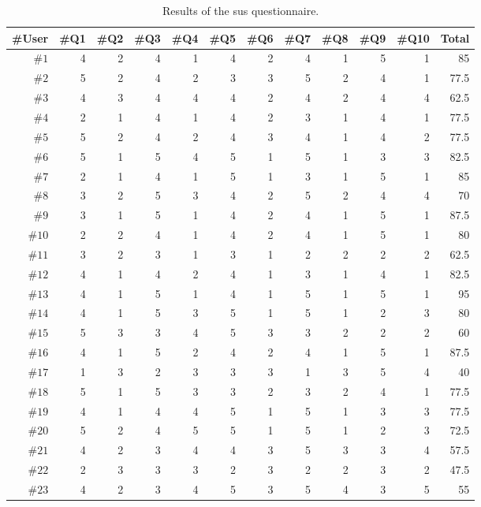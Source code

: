 \begin{table}
  \caption{Results of the \ac{sus} questionnaire.}
 \label{tbl:sus_questionnaire_results}
\footnotesize
\centering
 \begin{tabular}{r r r r r r r r r r r r}
  \hline 
  \textbf{\#User} &\textbf{\#Q1} & \textbf{\#Q2}& \textbf{\#Q3}& \textbf{\#Q4}& \textbf{\#Q5}& \textbf{\#Q6}& \textbf{\#Q7}& \textbf{\#Q8}& \textbf{\#Q9} & \textbf{\#Q10} & \textbf{Total}\\
    \hline
  $\#1$ & 4	& 2& 	4& 	1& 	4& 	2& 	4& 	1& 	5& 	1& 85\\
  $\#2$ & 5&	2&	4&	2&	3&	3&	5&	2&	4&	1& 77.5\\
  $\#3$ & 4&	3&	4&	4&	4&	2&	4&	2&	4&	4& 62.5\\
  $\#4$ & 2&	1&	4&	1&	4&	2&	3&	1&	4&	1& 77.5\\
  $\#5$ & 5&	2&	4&	2&	4&	3&	4&	1&	4&	2& 77.5\\
  $\#6$ & 5&	1&	5&	4&	5&	1&	5&	1&	3&	3& 82.5\\
  $\#7$ & 2&	1&	4&	1&	5&	1&	3&	1&	5&	1& 85\\
  $\#8$ & 3&	2&	5&	3&	4&	2&	5&	2&	4&	4& 70\\
  $\#9$ & 3&	1&	5&	1&	4&	2&	4&	1&	5&	1& 87.5\\
  $\#10$ & 2&	2&	4&	1&	4&	2&	4&	1&	5&	1& 80\\
  $\#11$ & 3&	2&	3&	1&	3&	1&	2&	2&	2&	2& 62.5\\
  $\#12$ & 4&	1&	4&	2&	4&	1&	3&	1&	4&	1& 82.5\\
  $\#13$ & 4&	1&	5&	1&	4&	1&	5&	1&	5&	1& 95\\
  $\#14$ & 4&	1&	5&	3&	5&	1&	5&	1&	2&	3& 80\\
  $\#15$ & 5&	3&	3&	4&	5&	3&	3&	2&	2&	2& 60\\
  $\#16$ & 4&	1&	5&	2&	4&	2&	4&	1&	5&	1& 87.5\\								
  $\#17$ & 1&	3&	2&	3&	3&	3&	1&	3&	5&	4& 40\\
  $\#18$ & 5&	1&	5&	3&	3&	2&	3&	2&	4&	1& 77.5\\
  $\#19$ & 4&	1&	4&	4&	5&	1&	5&	1&	3&	3& 77.5\\
  $\#20$ & 5&	2&	4&	5&	5&	1&	5&	1&	2&	3& 72.5\\
  $\#21$ & 4&	2&	3&	4&	4&	3&	5&	3&	3&	4& 57.5\\
  $\#22$ & 2&	3&	3&	3&	2&	3&	2&	2&	3&	2& 47.5\\
  $\#23$ & 4&	2&	3&	4&	5&	3&	5&	4&	3&	5& 55\\

  \hline
\end{tabular}
\end{table}